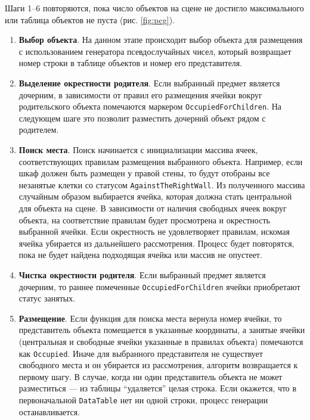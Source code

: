 Шаги 1--6 повторяются, пока число объектов на сцене не достигло максимального или таблица объектов не пуста (рис. \ref{fig:pcg}).

\begin{enumerate}

    \item \textbf{Выбор объекта}. На данном этапе происходит выбор объекта для размещения с использованием генератора псевдослучайных чисел, который возвращает номер строки в таблице объектов и номер его представителя.

    \item \textbf{Выделение окрестности родителя}. Если выбранный предмет является дочерним, в зависимости от правил его размещения ячейки вокруг родительского объекта помечаются маркером \texttt{Oc\-cu\-pi\-ed\-For\-Chil\-dren}. На следующем шаге это позволит разместить дочерний объект рядом с родителем. 
    
    \item \textbf{Поиск места}. Поиск начинается с инициализации массива ячеек, соответствующих правилам размещения выбранного объекта. Например, если шкаф должен быть размещен у правой стены, то будут отобраны все незанятые клетки со статусом \texttt{Aga\-inst\-The\-Right\-Wall}. Из полученного массива случайным образом выбирается ячейка, которая должна стать центральной для объекта на сцене. В зависимости от наличия свободных ячеек вокруг объекта, на соответствие правилам  будет просмотрена и окрестность выбранной ячейки. Если окрестность не удовлетворяет правилам, искомая ячейка убирается из дальнейшего рассмотрения. Процесс будет повторятся, пока не будет найдена подходящая ячейка или массив не опустеет.  
    
    \item \textbf{Чистка окрестности родителя}. Если выбранный предмет является дочерним, то раннее помеченные \texttt{Oc\-cu\-pi\-ed\-For\-Chil\-dren} ячейки приобретают статус занятых. 
    
    \item \textbf{Размещение}. Если функция для поиска места вернула номер ячейки, то представитель объекта помещается в указанные координаты, а занятые ячейки (центральная и свободные ячейки указанные в правилах объекта) помечаются как \texttt{Occupied}. Иначе для выбранного представителя не существует свободного места и он убирается из рассмотрения, алгоритм возвращается к первому шагу. В случае, когда ни один представитель объекта не может разместиться --- из таблицы \enquote{удаляется} целая строка. Если окажется, что в первоначальной \texttt{DataTable} нет ни одной строки, процесс генерации останавливается.


\end{enumerate}
